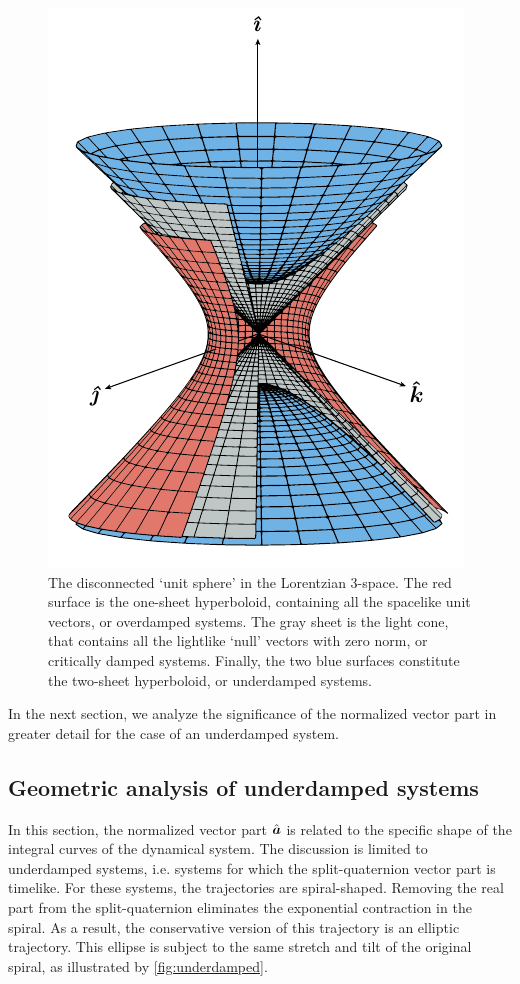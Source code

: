 \begin{figure}[ht!]
    \centering
    \includegraphics[]{media/other/hyperboloid.pdf}
    \caption{The disconnected `unit sphere' in the Lorentzian 3-space. The red surface is the one-sheet hyperboloid, containing all the spacelike unit vectors, or overdamped systems. The gray sheet is the light cone, that contains all the lightlike `null' vectors with zero norm, or critically damped systems. Finally, the two blue surfaces constitute the two-sheet hyperboloid, or underdamped systems.}
    \label{fig:hyperboloids}
\end{figure}

In the next section, we analyze the significance of the normalized vector part in greater detail for the case of an underdamped system.

\subsection{Geometric analysis of underdamped systems}
In this section, the normalized vector part $\uvec{a}$ is related to the specific shape of the integral curves of the dynamical system. The discussion is limited to underdamped systems, i.e. systems for which the split-quaternion vector part is timelike. 
For these systems, the trajectories are spiral-shaped. Removing the real part from the split-quaternion eliminates the exponential contraction in the spiral. As a result, the conservative version of this trajectory is an elliptic trajectory. This ellipse is subject to the same stretch and tilt of the original spiral, as illustrated by \cref{fig:underdamped}.

